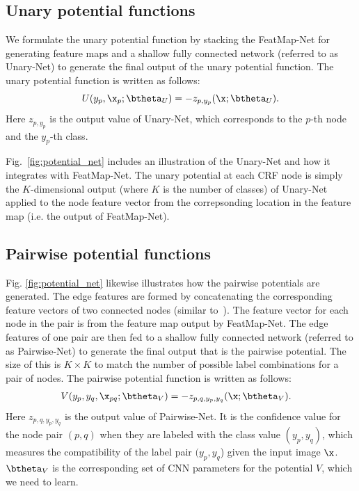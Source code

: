 \subsection{Unary potential functions}
We formulate the unary potential function by stacking the FeatMap-Net for generating feature maps and 
a shallow fully connected network (referred to as Unary-Net) to generate the final output of the unary potential function.
The unary potential function is written as follows:
\begin{equation}
	U(y_{p}, \x_p; \btheta_U) = - z_{p,y_p} (\x; \btheta_U).
\end{equation}
Here $z_{p, y_p }$ is the output value of Unary-Net, which corresponds to the $p$-th node and the $y_p$-th class.


Fig.~\ref{fig:potential_net} includes an illustration of the Unary-Net and how it integrates with FeatMap-Net.
%
The unary potential at each CRF node is simply the $K$-dimensional output (where $K$ is the number of classes) of Unary-Net applied to the node feature vector from the correpsonding location in the feature map (i.e. the output of FeatMap-Net).
%
%





\subsection{Pairwise potential functions}
Fig. \ref{fig:potential_net} likewise illustrates how the pairwise potentials are generated.  The edge features are formed by concatenating 
the corresponding feature vectors of two connected nodes (similar to~\cite{kolesnikov2014closed}).  The feature vector for each node in the pair is from the feature map output by FeatMap-Net. The edge features of one pair  are then fed to a shallow fully connected network (referred to as Pairwise-Net) to generate the final output that is the pairwise potential.  The size of this is $K \times K$ to match the number of possible label combinations for a pair of nodes. 
The pairwise potential function is written as follows:
\begin{align}
	V & (y_{p}, y_{q},  \x_{pq}; \btheta_V) = - z_{p, q, y_p, y_q} (\x; \btheta_V).
\end{align}
Here $z_{p, q,  y_p,  y_q }$ is the output value of Pairwise-Net.
It is the confidence value for the node pair $(p, q)$ when they are labeled with the class value $( y_p,  y_q )$, which measures the compatibility of the label pair $(y_{p}, y_{q}$) given the input image $\x$.
$\btheta_V$ is the corresponding set of CNN parameters for the potential $V$, which we need to learn.


